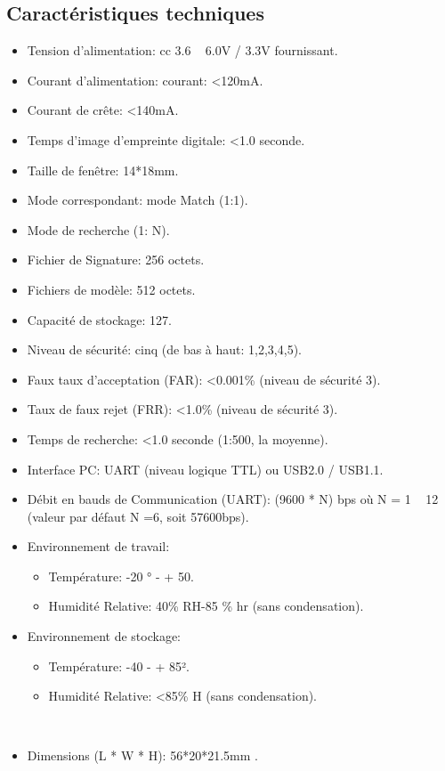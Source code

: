      \subsection{Caractéristiques techniques }
     \begin{itemize}
        \item Tension d'alimentation: cc 3.6 ~ 6.0V / 3.3V fournissant.
        \item Courant d'alimentation: courant: <120mA.
        \item Courant de crête: <140mA.
        \item Temps d'image d'empreinte digitale: <1.0 seconde.
        \item Taille de fenêtre: 14*18mm.
        \item Mode correspondant: mode Match (1:1).
        \item Mode de recherche (1: N).
        \item Fichier de Signature: 256 octets.
        \item Fichiers de modèle: 512 octets.
        \item Capacité de stockage: 127.
        \item Niveau de sécurité: cinq (de bas à haut: 1,2,3,4,5).
        \item Faux taux d'acceptation (FAR): <0.001\% (niveau de sécurité 3).
        \item Taux de faux rejet (FRR): <1.0\% (niveau de sécurité 3).
        \item Temps de recherche: <1.0 seconde (1:500, la moyenne).
        \item Interface PC: UART (niveau logique TTL) ou USB2.0 / USB1.1.
        \item Débit en bauds de Communication (UART): (9600 * N) bps où N = 1 ~ 12 (valeur par défaut N =6, soit 57600bps).
        \item Environnement de travail:
        \begin{itemize}
            \item [\textbullet]Température: -20 ° - + 50.
            \item [\textbullet]Humidité Relative: 40\% RH-85 \% hr (sans condensation).
        \end{itemize}
        
        \item Environnement de stockage:
        \begin{itemize}
            \item [\textbullet] Température: -40 - + 85².
            \item [\textbullet] Humidité Relative: <85\% H (sans condensation).
        \end{itemize}
        \
        \item Dimensions (L * W * H): 56*20*21.5mm .
     \end{itemize}
     

